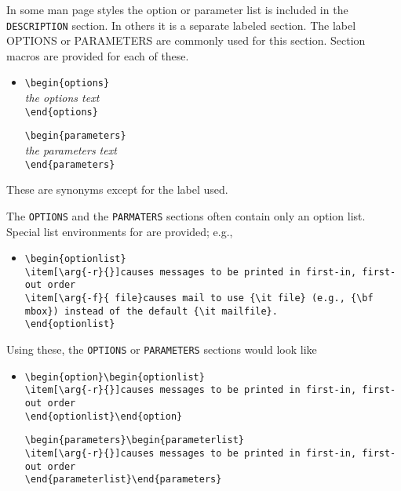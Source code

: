 In some man page styles the option or parameter list is included in
the {\tt DESCRIPTION} section.  In others it is a separate labeled
section. The label OPTIONS or PARAMETERS are commonly used for this
section.  Section macros are provided for each of these.
  \begin{itemize}
    \item[]
          \verb|\begin{options}|\\
          {\it the options text}\\
          \verb|\end{options}|

          \verb|\begin{parameters}|\\
          {\it the parameters text}\\
          \verb|\end{parameters}|
  \end{itemize}
These are synonyms except for the label used.  

The {\tt OPTIONS} and the {\tt PARMATERS} sections often contain only
an option list.   Special list environments for are provided; e.g.,
  \begin{itemize}
    \item[]
          \verb|\begin{optionlist}|\\
          \verb|\item[\arg{-r}{}]causes messages to be printed in first-in, first-out order|\\
          \verb|\item[\arg{-f}{ file}causes mail to use {\it file} (e.g., {\bf mbox}) instead of the default {\it mailfile}.|\\
          \verb|\end{optionlist}|
  \end{itemize}
Using these, the {\tt OPTIONS} or {\tt PARAMETERS} sections would look like
  \begin{itemize}
    \item[]
          \verb|\begin{option}\begin{optionlist}|\\
          \verb|\item[\arg{-r}{}]causes messages to be printed in first-in, first-out order|\\
          \verb|\end{optionlist}\end{option}|

          \verb|\begin{parameters}\begin{parameterlist}|\\
          \verb|\item[\arg{-r}{}]causes messages to be printed in first-in, first-out order|\\
          \verb|\end{parameterlist}\end{parameters}|
  \end{itemize}

